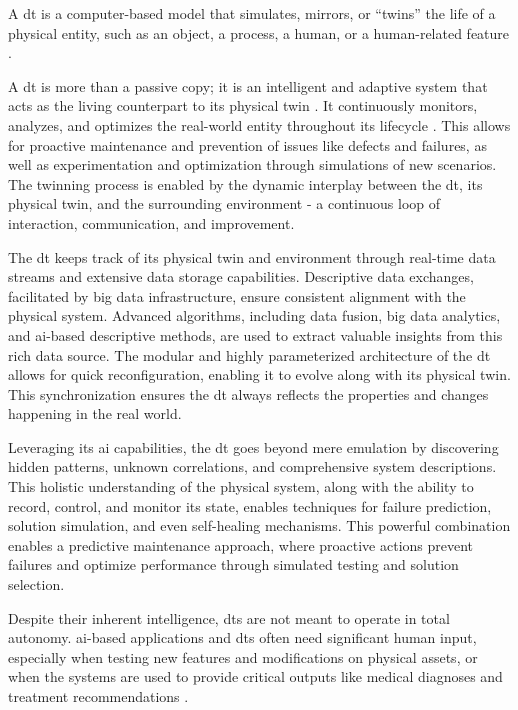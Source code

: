 A \acrshort{dt} is a computer-based model that simulates, mirrors, or ``twins'' the life of a physical entity, such as an object, a process, a human, or a human-related feature \parencite{barricelliMultiModalApproachCreating2022}.

A \acrshort{dt} is more than a passive copy; it is an intelligent and adaptive system that acts as the living counterpart to its physical twin \parencite{grievesDigitalTwinManufacturing2015,kritzingerDigitalTwinManufacturing2018}. It continuously  monitors, analyzes, and optimizes the real-world entity throughout its lifecycle \parencite{negriReviewRolesDigital2017}. This allows for proactive maintenance and prevention of issues like defects and failures, as well as experimentation and optimization through simulations of new scenarios. The twinning process is enabled by the dynamic interplay between the \acrshort{dt}, its physical twin, and the surrounding environment - a continuous loop of interaction, communication, and improvement.

The \acrshort{dt} keeps track of its physical twin and environment through real-time data streams and extensive data storage capabilities. Descriptive data exchanges, facilitated by big data infrastructure, ensure consistent alignment with the physical system. Advanced algorithms, including data fusion, big data analytics, and \acrshort{ai}-based descriptive methods, are used to extract valuable insights from this rich data source. The modular and highly parameterized architecture of the \acrshort{dt} allows for quick reconfiguration, enabling it to evolve along with its physical twin. This synchronization ensures the \acrshort{dt} always reflects the properties and changes happening in the real world.

Leveraging its \acrshort{ai} capabilities, the \acrshort{dt} goes beyond mere emulation by discovering hidden patterns, unknown correlations, and comprehensive system descriptions. This holistic understanding of the physical system, along with the ability to record, control, and monitor its state, enables techniques for failure prediction, solution simulation, and even self-healing mechanisms. This powerful combination enables a predictive maintenance approach, where proactive actions prevent failures and optimize performance through simulated testing and solution selection.

Despite their inherent intelligence, \acrshort{dt}s are not meant to operate in total autonomy. \acrshort{ai}-based applications and \acrshort{dt}s often need significant human input, especially when testing new features and modifications on physical assets, or when the systems are used to provide critical outputs like medical diagnoses and treatment recommendations \parencite{barricelliSurveyDigitalTwin2019}.

